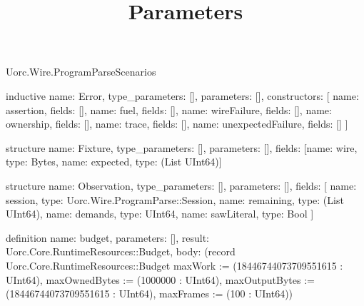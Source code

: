 \begin{lexlean}{Uorc.Wire.ProgramParseScenarios}
\title{Parameters}
\begin{semanticmodule}
inductive{
  name: Error,
  type_parameters: [],
  parameters: [],
  constructors: [
    {name: assertion, fields: []},
    {name: fuel, fields: []},
    {name: wireFailure, fields: []},
    {name: ownership, fields: []},
    {name: trace, fields: []},
    {name: unexpectedFailure, fields: []}
  ]
}

structure{
  name: Fixture,
  type_parameters: [],
  parameters: [],
  fields: [{name: wire, type: Bytes}, {name: expected, type: (List UInt64)}]
}

structure{
  name: Observation,
  type_parameters: [],
  parameters: [],
  fields: [
    {name: session, type: Uorc.Wire.ProgramParse::Session},
    {name: remaining, type: (List UInt64)},
    {name: demands, type: UInt64},
    {name: sawLiteral, type: Bool}
  ]
}

definition{
  name: budget,
  parameters: [],
  result: Uorc.Core.RuntimeResources::Budget,
  body: (record Uorc.Core.RuntimeResources::Budget {maxWork := (18446744073709551615 : UInt64), maxOwnedBytes := (1000000 : UInt64), maxOutputBytes := (18446744073709551615 : UInt64), maxFrames := (100 : UInt64)})
}


\end{semanticmodule}
\end{lexlean}
